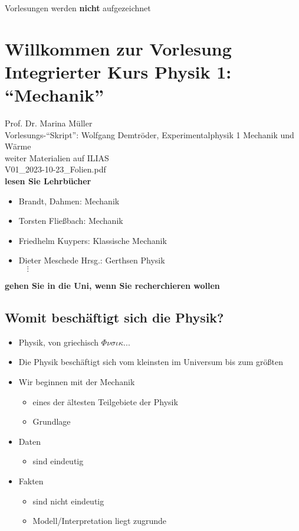\documentclass{gadsescript}
\begin{document}
Vorlesungen werden \textbf{nicht} aufgezeichnet

\section{Willkommen zur Vorlesung Integrierter Kurs Physik 1: ``Mechanik''}
Prof. Dr. Marina Müller\\
Vorlesungs-``Skript'': Wolfgang Demtröder, Experimentalphysik 1 Mechanik und Wärme\\
\indent\quad weiter Materialien auf ILIAS\\
\indent\qquad V01\_2023-10-23\_Folien.pdf\\

\textbf{lesen Sie Lehrbücher}
\begin{itemize}
	\item Brandt, Dahmen: Mechanik
	\item Torsten Fließbach: Mechanik
	\item Friedhelm Kuypers: Klassische Mechanik
	\item Dieter Meschede Hrsg.: Gerthsen Physik\\
		\indent$\quad \vdots$
\end{itemize}

\textbf{gehen Sie in die Uni, wenn Sie recherchieren wollen}

\subsection{Womit beschäftigt sich die Physik?}
\begin{itemize}
	\item Physik, von griechisch $\Phi\nu\sigma\iota\kappa...$\\
	\item Die Physik beschäftigt sich vom kleinsten im Universum bis zum größten
	\item Wir beginnen mit der Mechanik
		\begin{itemize}
			\item eines der ältesten Teilgebiete der Physik
			\item Grundlage
		\end{itemize}
\end{itemize}

\begin{itemize}
	\item Daten
		\begin{itemize}
			\item sind eindeutig
		\end{itemize}
	\item Fakten
		\begin{itemize}
			\item sind nicht eindeutig
			\item Modell/Interpretation liegt zugrunde
		\end{itemize}
\end{itemize}
\end{document}
